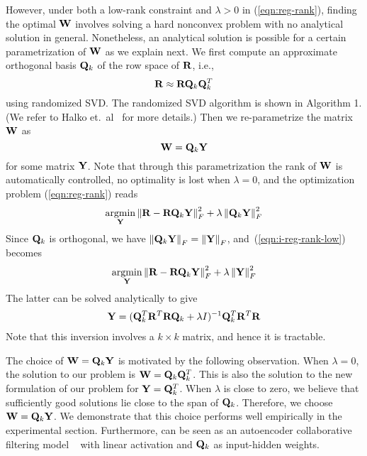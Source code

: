 %



However, under both a low-rank constraint and $\lambda > 0$ in (\ref{eqn:reg-rank}), finding the optimal $\mathbf{W}$ involves solving a hard nonconvex problem with no analytical solution in general. Nonetheless, an analytical solution is possible for a certain parametrization of $\mathbf{W}$ as we explain next. We first compute an approximate orthogonal basis $\mathbf{Q}_k$ of the row space of $\mathbf{R}$, i.e.,
\begin{equation}
\mathbf{R} \approx \mathbf{R} \mathbf{Q}_k \mathbf{Q}_k^T
\end{equation}
using randomized SVD. The randomized SVD algorithm is shown in Algorithm 1. (We refer to Halko et.~al~\citep{halko2011} for more details.)
Then we re-parametrize the matrix $\mathbf{W}$ as 
\begin{equation}
\mathbf{W} = \mathbf{Q}_k \mathbf{Y}
\end{equation}
for some matrix $\mathbf{Y}$. Note that through this parametrization the rank of $\mathbf{W}$ is automatically controlled, no optimality is lost when $\lambda=0$, and the optimization problem (\ref{eqn:reg-rank}) reads
\begin{align}
\label{eqn:i-reg-rank-low}
\underset{\mathbf{Y}} {\mathrm{argmin}}  \left \| \mathbf{R} - \mathbf{R} \mathbf{Q}_k \mathbf{Y} \right \|_F^2 + \lambda \left \|  \mathbf{Q}_k \mathbf{Y} \right \|_F^2 
\end{align}
Since $\mathbf{Q}_k$ is orthogonal, we have $\left \| \mathbf{Q}_k \mathbf{Y} \right \|_F = \left \|\mathbf{Y}\right \|_F$, and~(\ref{eqn:i-reg-rank-low}) becomes 
\begin{align}
\underset{\mathbf{Y}}{\mathrm{argmin}} \left \| \mathbf{R} - \mathbf{R}\mathbf{Q}_k\mathbf{Y}\right \|_F^2 + \lambda \left \|  \mathbf{Y} \right \|_F^2 
\end{align}
The latter can be solved analytically to give 
\begin{align*}
\mathbf{Y} = (\mathbf{Q}_k^T \mathbf{R}^T\mathbf{R}\mathbf{Q}_k +\lambda I)^{-1} \mathbf{Q}_k^T \mathbf{R}^T \mathbf{R}
\end{align*}
Note that this inversion involves a $k \times k$ matrix, and hence it is tractable.


The choice of $\mathbf{W} = \mathbf{Q}_k \mathbf{Y}$ is motivated by the following observation. When $\lambda = 0$, the solution to our problem is $\mathbf{W} = \mathbf{Q}_k \mathbf{Q}_k^T$. This is also the solution to the new formulation of our problem for $\mathbf{Y} = \mathbf{Q}_k^T$. When $\lambda$ is close to zero, we believe that sufficiently good solutions lie close to the span of $\mathbf{Q}_k$. Therefore, we choose $\mathbf{W} = \mathbf{Q}_k \mathbf{Y}$. We demonstrate that this choice performs well empirically in the experimental section. Furthermore, \LinearLow can be seen as an autoencoder collaborative filtering model ~\cite{Sedhain:2015} with linear activation and $\mathbf{Q}_k$ as input-hidden weights.
 
